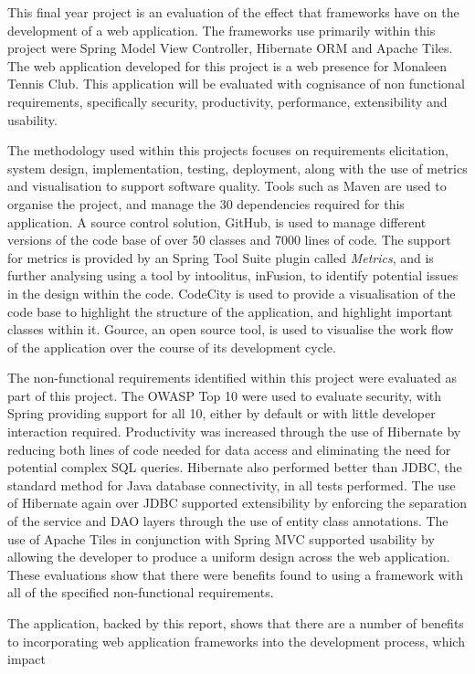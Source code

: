 This final year project is an evaluation of the effect that frameworks have on the development of a web application. The frameworks use primarily within this project were Spring Model View Controller, Hibernate ORM and Apache Tiles. The web application developed for this project is a web presence for Monaleen Tennis Club. This application will be evaluated with cognisance of non functional requirements, specifically security, productivity, performance, extensibility and usability.

The methodology used within this projects focuses on requirements elicitation, system design, implementation, testing, deployment, along with the use of metrics and visualisation to support software quality. Tools such as Maven are used to organise the project, and manage the 30 dependencies required for this application. A source control solution, GitHub, is used to manage different versions of the code base of over 50 classes and 7000 lines of code. The support for metrics is provided by an Spring Tool Suite plugin called \textit{Metrics}, and is further analysing using a tool by intoolitus, inFusion, to identify potential issues in the design within the code. CodeCity is used to provide a visualisation of the code base to highlight the structure of the application, and highlight important classes within it. Gource, an open source tool, is used to visualise the work flow of the application over the course of its development cycle. 

The non-functional requirements identified within this project were evaluated as part of this project. The OWASP Top 10 were used to evaluate security, with Spring providing support for all 10, either by default or with little developer interaction required. Productivity was increased through the use of Hibernate by reducing both lines of code needed for data access and eliminating the need for potential complex SQL queries. Hibernate also performed better than JDBC, the standard method for Java database connectivity, in all tests performed. The use of Hibernate again over JDBC supported extensibility by enforcing the separation of the service and DAO layers through the use of entity class annotations. The use of Apache Tiles in conjunction with Spring MVC supported usability by allowing the developer to produce a uniform design across the web application. These evaluations show that there were benefits found to using a framework with all of the specified non-functional requirements. 

The application, backed by this report, shows that there are a number of benefits to incorporating web application frameworks into the development process, which impact





